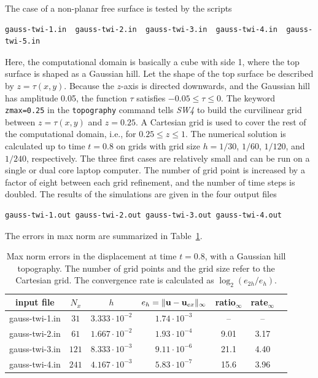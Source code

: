 \documentclass[11pt]{report}
\newcommand{\ub}{{\bf u}}
\begin{document}
The case of a non-planar free surface is tested by the scripts
\begin{verbatim}
gauss-twi-1.in  gauss-twi-2.in  gauss-twi-3.in  gauss-twi-4.in  gauss-twi-5.in
\end{verbatim}
Here, the computational domain is basically a cube with side 1, where the top surface is shaped as a
Gaussian hill. Let the shape of the top surface be described by $z=\tau(x,y)$. Because the $z$-axis
is directed downwards, and the Gaussian hill has amplitude 0.05, the function $\tau$ satisfies
$-0.05\leq \tau\leq 0$. The keyword {\tt zmax=0.25} in the {\tt topography} command tells
\emph{SW4} to build the curvilinear grid between $z=\tau(x,y)$ and $z=0.25$. A Cartesian grid is
used to cover the rest of the computational domain, i.e., for $0.25\leq z\leq 1$. The numerical
solution is calculated up to time $t=0.8$ on grids with grid size $h=1/30$, $1/60$, $1/120$,
and $1/240$, respectively. The three first cases are relatively small and can be run on a
single or dual core laptop computer. The number of grid point is increased by a factor of eight
between each grid refinement, and the number of time steps is doubled.
The results of the simulations are given in the four output files
\begin{verbatim}
gauss-twi-1.out gauss-twi-2.out gauss-twi-3.out gauss-twi-4.out
\end{verbatim}
The errors in max norm are summarized in Table~\ref{tab:twi-gauss-err}.
\begin{table}
\begin{center}
\begin{tabular}{| c | c | c | c | c | c  | c | }
\hline
input file & $N_x$ & $h$ & $e_h=\| \ub - \ub_{ex}\|_\infty$  & ratio$_\infty$ & rate$_\infty$ \\ \hline
gauss-twi-1.in & $31$  & $3.333\cdot 10^{-2}$  & $1.74\cdot 10^{-3}$ & --   & --   \\ \hline
gauss-twi-2.in & $61$  & $1.667\cdot 10^{-2}$  & $1.93\cdot 10^{-4}$ & 9.01 & 3.17 \\ \hline
gauss-twi-3.in & $121$ & $8.333\cdot 10^{-3}$  & $9.11\cdot 10^{-6}$ & 21.1 & 4.40 \\ \hline
gauss-twi-4.in & $241$ & $4.167\cdot 10^{-3}$  & $5.83\cdot 10^{-7}$ & 15.6 & 3.96 \\ \hline
\end{tabular}
\caption{Max norm errors in the displacement at time $t=0.8$, with a Gaussian hill topography. The
  number of grid points and the grid size refer to the Cartesian grid. The convergence rate is
  calculated as $\log_2(e_{2h}/e_h)$. }
\label{tab:twi-gauss-err}
\end{center}
\end{table}
\end{document}
